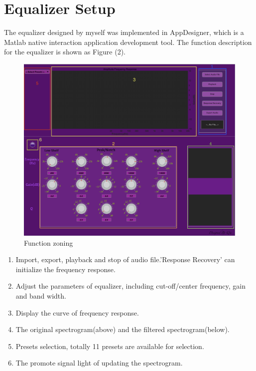 \documentclass[a4paper]{tufte-handout} %
\begin{document}
\section{Equalizer Setup}
The equalizer designed by myself was implemented in AppDesigner, which is a Matlab native interaction application development tool. The function description for the equalizer is shown as Figure (2).
\begin{figure}[h]
    \includegraphics{Image/FilterRefer.png}
    \caption{Function zoning}
    \label{fig:textfig}
\end{figure}
\begin{enumerate}
    \item Import, export, playback and stop of audio file.'Response Recovery' can initialize the frequency response.
    \item Adjust the parameters of equalizer, including cut-off/center frequency, gain and band width.
    \item Display the curve of frequency response.
    \item The original spectrogram(above) and the filtered spectrogram(below).
    \item Presets selection, totally 11 presets are available for selection.
    \item The promote signal light of updating the spectrogram.
\end{enumerate}
\end{document}
